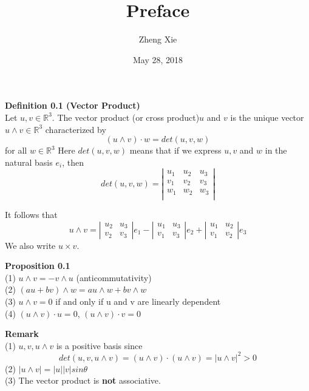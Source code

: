 \documentclass{article}
\author{Zheng Xie}
\title{Preface}
\date{May 28, 2018}
\begin{document}
    \maketitle
    
    \setlength\parindent{0em}   %
    \setlength\parskip{1.0\baselineskip} %
    
    \par
    \textbf{Definition 0.1 (Vector Product)}\\
    Let $u,v \in \mathbb R^3$. The vector product (or cross product)$u$ and $v$ is the unique vector 
    $u \land v \in \mathbb R^3$ characterized by
    $$
        (u \land v)\cdot w = det(u,v,w)
    $$ 
    for all $w \in \mathbb R^3$
    Here $det(u,v,w)$ means that if we express $u,v$ and $w$ in the natural basis ${e_i}$, then
    $$
        det(u,v,w) =   
        \left| \begin{array}{ccc}   
            u_1 & u_2 & u_3 \\
            v_1 & v_2 & v_3 \\
            w_1 & w_2 & w_3 \\  
        \end{array} \right|   
    $$
    
    It follows that
    $$
        u \land v = 
        \left| \begin{array}{cc}
            u_2 & u_3 \\
            v_2 & v_3 
        \end{array} \right|e_1
        -
        \left| \begin{array}{cc}
            u_1 & u_3 \\
            v_1 & v_3 
        \end{array} \right|e_2
        +
        \left| \begin{array}{cc}
            u_1 & u_2 \\
            v_1 & v_2 
        \end{array} \right|e_3
    $$
    We also write $u \times v$.\\
    
    \par
    \textbf{Proposition 0.1}\\
    (1) $u \land v = -v \land u$ (anticommutativity)\\
    (2) $(au + bv) \land w = au \land w + bv \land w$\\
    (3) $u \land v = 0$ if and only if u and v are linearly dependent\\
    (4) $(u \land v) \cdot u = 0$, $(u \land v) \cdot v = 0$
    
    \par
    \textbf{Remark}\\
    (1) ${u, v, u \land v}$ is a positive basis since 
        $$
            det(u, v, u \land v) = (u \land v) \cdot (u \land v) = |u \land v|^2 > 0
        $$
    (2) $|u \land v| = |u||v|sin\theta$\\
    (3) The vector product is \textbf{not} associative.

    
\end{document}
